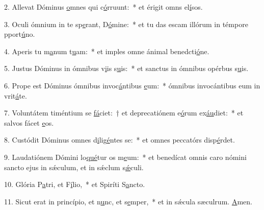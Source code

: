 2. Allevat Dóminus \uline{o}mnes qui c\uline{ó}rruunt:~* et érigit omns el\uline{í}sos.\par 
3. Oculi ómnium in te sp\uline{e}rant, D\uline{ó}mine:~* et tu das escam illórum in témpore pport\uline{ú}no.\par 
4. Aperis tu m\uline{a}num t\uline{u}am:~* et imples omne ánimal benedcti\uline{ó}ne.\par 
5. Justus Dóminus in ómnibus v\uline{i}is s\uline{u}is:~* et sanctus in ómnibus opérbus s\uline{u}is.\par 
6. Prope est Dóminus ómnibus invoc\uline{á}ntibus \uline{e}um:~* ómnibus invocántibus eum in vrit\uline{á}te.\par 
7. Voluntátem timéntium se \uline{fá}ciet:~† et deprecatiónem e\uline{ó}rum ex\uline{áu}diet:~* et salvos fácet \uline{e}os.\par 
8. Custódit Dóminus omnes d\uline{i}lig\uline{é}ntes se:~* et omnes peccatórs disp\uline{é}rdet.\par 
9. Laudatiónem Dómini lo\uline{qué}tur os m\uline{e}um:~* et benedícat omnis caro nómini sancto ejus in sǽculum, et in sǽclum s\uline{ǽ}culi.\par 
10. Glória P\uline{a}tri, et F\uline{í}lio,~* et Spiríti S\uline{a}ncto.\par 
11. Sicut erat in princípio, et n\uline{u}nc, et s\uline{e}mper,~* et in sǽcula sæculrum. \uline{A}men.\par 
